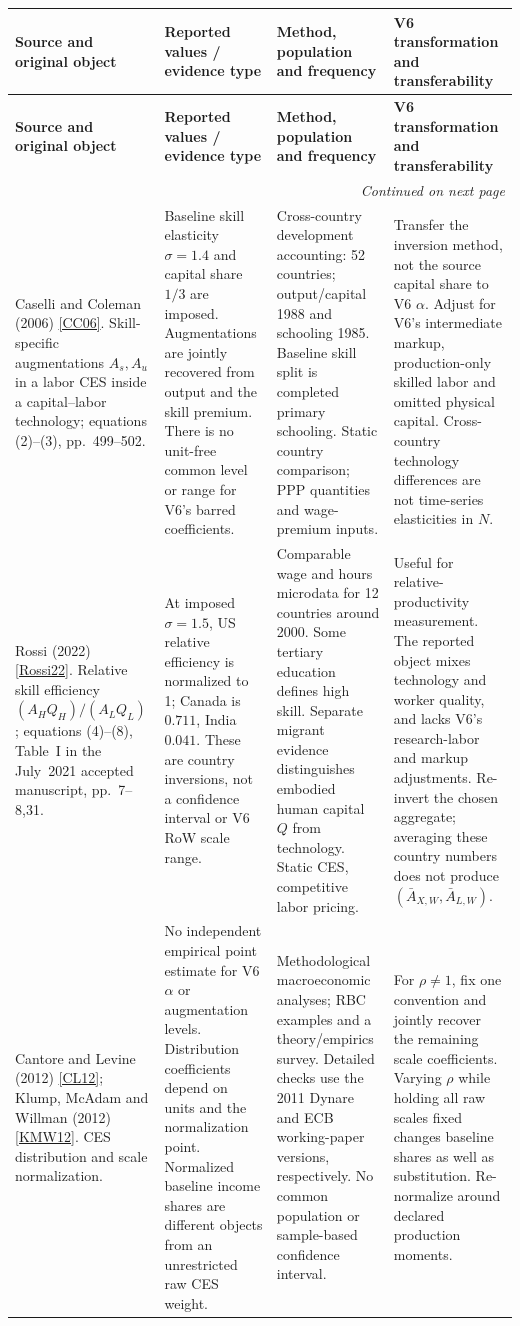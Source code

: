 \documentclass[10pt,a4paper,landscape]{article}
\makeatletter
\newcommand{\src}[1]{\hyperlink{ref:#1}{\textsf{[#1]}}}
\newenvironment{evidence}{%
\fontsize{9.4}{10.9}\selectfont\setlength{\parskip}{2pt}
\begin{longtable}{@{}P{\dimexpr .22\textwidth-7.5pt\relax}P{\dimexpr .24\textwidth-7.5pt\relax}P{\dimexpr .25\textwidth-7.5pt\relax}P{\dimexpr .29\textwidth-7.5pt\relax}@{}}
\toprule\rowcolor{tablehead}\textbf{Source and original object} & \textbf{Reported values / evidence type} & \textbf{Method, population and frequency} & \textbf{V6 transformation and transferability}\\\midrule
\endfirsthead
\toprule\rowcolor{tablehead}\textbf{Source and original object} & \textbf{Reported values / evidence type} & \textbf{Method, population and frequency} & \textbf{V6 transformation and transferability}\\\midrule
\endhead
\midrule\multicolumn{4}{r}{\footnotesize\itshape Continued on next page}\\\endfoot
\bottomrule\endlastfoot
}{\end{longtable}}
\makeatother
\begin{document}
\begin{evidence}
Caselli and Coleman (2006) \src{CC06}.
Skill-specific augmentations $A_s,A_u$ in a labor CES inside a capital--labor technology;
equations (2)--(3), pp.~499--502.
&
Baseline skill elasticity $\sigma=1.4$ and capital share $1/3$ are imposed.
Augmentations are jointly recovered from output and the skill premium.
There is no unit-free common level or range for V6's barred coefficients.
&
Cross-country development accounting: 52 countries; output/capital 1988 and
schooling 1985. Baseline skill split is completed primary schooling.
Static country comparison; PPP quantities and wage-premium inputs.
&
Transfer the inversion method, not the source capital share to V6 $\alpha$.
Adjust for V6's intermediate markup, production-only skilled labor and omitted physical
capital. Cross-country technology differences are not time-series elasticities in $N$.
\\[5pt]
Rossi (2022) \src{Rossi22}.
Relative skill efficiency $(A_HQ_H)/(A_LQ_L)$; equations (4)--(8), Table~I
in the July~2021 accepted manuscript, pp.~7--8,31.
&
At imposed $\sigma=1.5$, US relative efficiency is normalized to 1;
Canada is $0.711$, India $0.041$. These are country inversions,
not a confidence interval or V6 RoW scale range.
&
Comparable wage and hours microdata for 12 countries around 2000.
Some tertiary education defines high skill.
Separate migrant evidence distinguishes embodied human capital $Q$ from technology.
Static CES, competitive labor pricing.
&
Useful for relative-productivity measurement. The reported object mixes
technology and worker quality, and lacks V6's research-labor and markup adjustments.
Re-invert the chosen aggregate; averaging these country numbers does not produce
$(\bar A_{X,W},\bar A_{L,W})$.
\\[5pt]
Cantore and Levine (2012) \src{CL12};
Klump, McAdam and Willman (2012) \src{KMW12}.
CES distribution and scale normalization.
&
No independent empirical point estimate for V6 $\alpha$ or augmentation levels.
Distribution coefficients depend on units and the normalization point.
Normalized baseline income shares are different objects from an unrestricted raw CES weight.
&
Methodological macroeconomic analyses; RBC examples and a theory/empirics survey.
Detailed checks use the 2011 Dynare and ECB working-paper versions,
respectively. No common population or sample-based confidence interval.
&
For $\rho\ne1$, fix one convention and jointly recover the remaining scale
coefficients. Varying $\rho$ while holding all raw scales fixed changes
baseline shares as well as substitution. Re-normalize around declared production moments.

\end{evidence}
\end{document}
